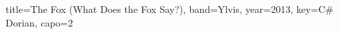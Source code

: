 \documentclass{bekki-leadsheet}
\begin{document}
\begin{song}[transpose-capo=true]{title={The Fox (What Does the Fox Say?)}, band={Ylvis}, year={2013}, key={C# Dorian}, capo={2}}



\end{song}
\end{document}

